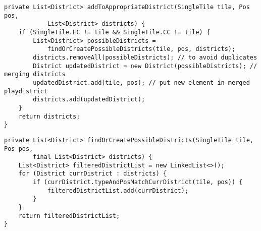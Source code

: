 \begin{lstlisting}[style=CodeHighlighting,float,caption=Player - addToAppropriateDistrict,label=lst:player_addToAppropriateDistrict]
private List<District> addToAppropriateDistrict(SingleTile tile, Pos pos, 
			List<District> districts) {
    if (SingleTile.EC != tile && SingleTile.CC != tile) {
        List<District> possibleDistricts = 
        	findOrCreatePossibleDistricts(tile, pos, districts);
        districts.removeAll(possibleDistricts); // to avoid duplicates
        District updatedDistrict = new District(possibleDistricts); // merging districts
        updatedDistrict.add(tile, pos); // put new element in merged playdistrict
        districts.add(updatedDistrict);
    }
    return districts;
}
\end{lstlisting}


\begin{lstlisting}[style=CodeHighlighting,float,caption=Player - findOrCreatePossibleDistricts,label=lst:player_findOrCreatePossibleDistricts]
private List<District> findOrCreatePossibleDistricts(SingleTile tile, Pos pos, 
		final List<District> districts) {
    List<District> filteredDistrictList = new LinkedList<>();
    for (District currDistrict : districts) {
        if (currDistrict.typeAndPosMatchCurrDistrict(tile, pos)) {
            filteredDistrictList.add(currDistrict);
        }
    }
    return filteredDistrictList;
}
\end{lstlisting}


